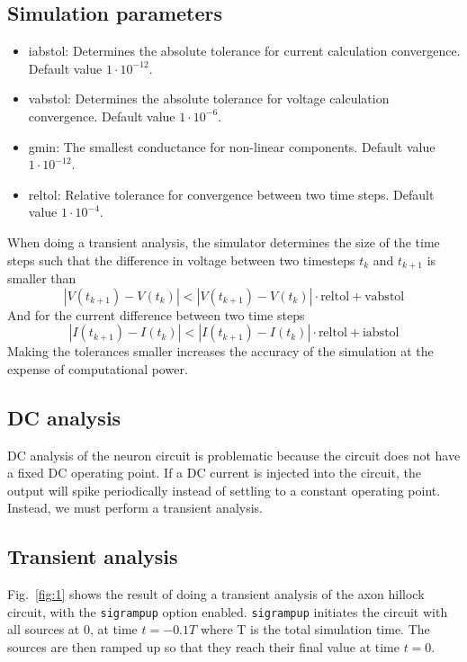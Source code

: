 \subsection{Simulation parameters}
\begin{itemize}
    \item iabstol: Determines the absolute tolerance for current calculation convergence. Default
        value \(1\cdot10^{-12}\).
    \item vabstol: Determines the absolute tolerance for voltage calculation convergence. Default
        value \(1\cdot10^{-6}\).
    \item gmin: The smallest conductance for non-linear components. Default value \(1\cdot10^{-12}\).
    \item reltol: Relative tolerance for convergence between two time steps. Default value \(1\cdot10^{-4}\).
\end{itemize}
When doing a transient analysis, the simulator determines the size of the time steps such that the difference
in voltage between two timesteps \(t_{k}\) and \(t_{k+1}\) is smaller than
\begin{equation*}
    |V(t_{k+1}) - V(t_{k})| < |V(t_{k+1}) - V(t_{k})|\cdot \text{reltol} + \text{vabstol}
\end{equation*}
And for the current difference between two time steps
\begin{equation*}
    |I(t_{k+1}) - I(t_{k})| < |I(t_{k+1}) - I(t_{k})|\cdot \text{reltol} + \text{iabstol}
\end{equation*}
Making the tolerances smaller increases the accuracy of the simulation at the expense of computational power.

\subsection{DC analysis}
DC analysis of the neuron circuit is problematic because the circuit does not have a fixed DC operating point. If
a DC current is injected into the circuit, the output will spike periodically instead of settling to a constant operating
point. Instead, we must perform a transient analysis.

\subsection{Transient analysis}
Fig.~\ref{fig:1} shows the result of doing a transient analysis of the axon hillock circuit, with the \texttt{sigrampup} option enabled.
\texttt{sigrampup} initiates the circuit with all sources at \(0\), at time \(t=-0.1T\) where T is the total simulation time. The sources
are then ramped up so that they reach their final value at time \(t=0\). 


